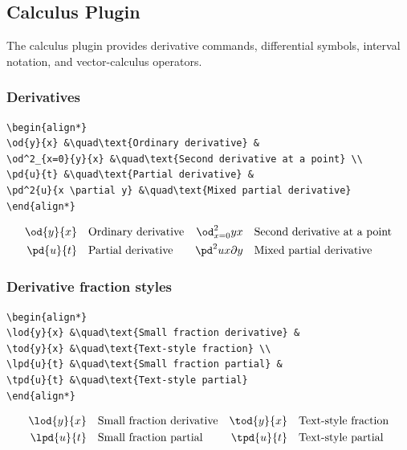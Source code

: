 \documentclass{article}
\begin{document}
\subsection{Calculus Plugin}

The calculus plugin provides derivative commands, differential symbols, interval notation, and vector-calculus operators.

\subsubsection*{Derivatives}
\begin{verbatim}
\begin{align*}
\od{y}{x} &\quad\text{Ordinary derivative} &
\od^2_{x=0}{y}{x} &\quad\text{Second derivative at a point} \\
\pd{u}{t} &\quad\text{Partial derivative} &
\pd^2{u}{x \partial y} &\quad\text{Mixed partial derivative}
\end{align*}
\end{verbatim}
\begin{align*}
\od{y}{x} &\quad\text{Ordinary derivative} &
\od^2_{x=0}{y}{x} &\quad\text{Second derivative at a point} \\
\pd{u}{t} &\quad\text{Partial derivative} &
\pd^2{u}{x \partial y} &\quad\text{Mixed partial derivative}
\end{align*}

\subsubsection*{Derivative fraction styles}
\begin{verbatim}
\begin{align*}
\lod{y}{x} &\quad\text{Small fraction derivative} &
\tod{y}{x} &\quad\text{Text-style fraction} \\
\lpd{u}{t} &\quad\text{Small fraction partial} &
\tpd{u}{t} &\quad\text{Text-style partial}
\end{align*}
\end{verbatim}
\begin{align*}
\lod{y}{x} &\quad\text{Small fraction derivative} &
\tod{y}{x} &\quad\text{Text-style fraction} \\
\lpd{u}{t} &\quad\text{Small fraction partial} &
\tpd{u}{t} &\quad\text{Text-style partial}
\end{align*}
\end{document}
